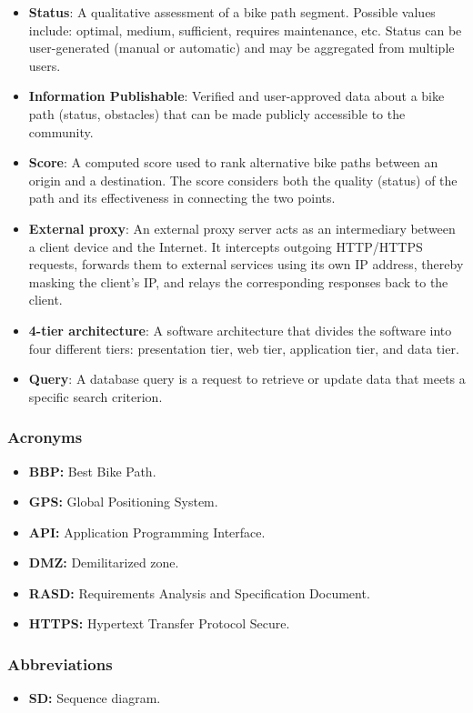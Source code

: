 \begin{itemize}
    \item \textbf{Status}: A qualitative assessment of a bike path segment. Possible values include: optimal, medium, sufficient, requires maintenance, etc. Status can be user-generated (manual or automatic) and may be aggregated from multiple users.
    \item \textbf{Information Publishable}: Verified and user-approved data about a bike path (status, obstacles) that can be made publicly accessible to the community.
    \item \textbf{Score}: A computed score used to rank alternative bike paths between an origin and a destination. The score considers both the quality (status) of the path and its effectiveness in connecting the two points.
    \item \textbf{External proxy}: An external proxy server acts as an intermediary between a client device and the Internet. It intercepts outgoing HTTP/HTTPS requests, forwards them to external services using its own IP address, thereby masking the client’s IP, and relays the corresponding responses back to the client.
    \item \textbf{4-tier architecture}: A software architecture that divides the software into four different tiers: presentation tier, web tier, application tier, and data tier.
    \item \textbf{Query}: A database query is a request to retrieve or update data that meets a specific search criterion.
\end{itemize}

\subsubsection{Acronyms}
\begin{itemize}
    \item \textbf{BBP:} Best Bike Path.
    \item \textbf{GPS:} Global Positioning System.
    \item \textbf{API:}  Application Programming Interface.
    \item \textbf{DMZ:}  Demilitarized zone.
    \item \textbf{RASD:} Requirements Analysis and Specification Document.
    \item \textbf{HTTPS:} Hypertext Transfer Protocol Secure.
\end{itemize}

\subsubsection{Abbreviations}
\begin{itemize}
    \item \textbf{SD:} Sequence diagram.
\end{itemize}

